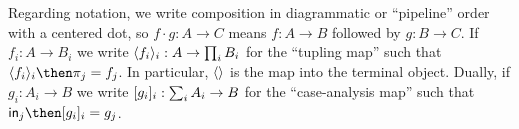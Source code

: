 Regarding notation, we write composition in diagrammatic or ``pipeline'' order
with a centered dot, so $f \cdot g : A \to C$ means $f : A \to B$ followed by $g
: B \to C$.
%
If $f_i : A \to B_i$ we write $\langle{f_i}\rangle_i : A \to \prod_i B_i$ for the
``tupling map'' such that $\fork{f_i}_i \then \pi_j = f_j$.
%
In particular, $\langle{}\rangle$ is the map into the terminal object.
%
Dually, if $g_i : A_i \to B$ we write $[{g_i}]_i : \sum_i A_i \to B$ for the
``case-analysis map'' such that $\injc_j \then \krof{g_i}_i = g_j$.


